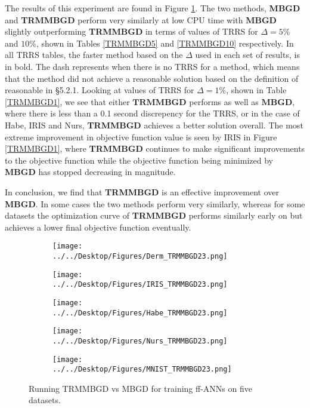 \documentclass[letterpaper,12pt,titlepage,oneside,final]{book}
\begin{document}
	The results of this experiment are found in Figure \ref{figure:TRMMBGD}. The two methods, \textbf{MBGD} and \textbf{TRMMBGD} perform very similarly at low CPU time with \textbf{MBGD} slightly outperforming \textbf{TRMMBGD} in terms of values of TRRS for $\Delta=5\%$ and $10\%$, shown in Tables \ref{TRMMBGD5} and \ref{TRMMBGD10} respectively.  In all TRRS tables, the faster method based on the $\Delta$ used in each set of results, is in bold. The dash represents when there is no TRRS for a method, which means that the method did not achieve a reasonable solution based on the definition of reasonable in \S{5.2.1}. Looking at values of TRRS for $\Delta=1\%$, shown in Table \ref{TRMMBGD1}, we see that either $\textbf{TRMMBGD}$ performs as well as $\mathbf{MBGD}$, where there is less than a 0.1 second discrepency for the TRRS, or in the case of Habe, IRIS and Nurs, \textbf{TRMMBGD} achieves a better solution overall. The most extreme improvement in objective function value is seen by IRIS in Figure \ref{TRMMBGD1}, where \textbf{TRMMBGD} continues to make significant improvements to the objective function while the objective function being minimized by \textbf{MBGD} has stopped decreasing in magnitude. 
	
	In conclusion, we find that \textbf{TRMMBGD} is an effective improvement over \textbf{MBGD}. In some cases the two methods perform very similarly, whereas for some datasets the optimization curve of \textbf{TRMMBGD} performs similarly early on but achieves a lower final objective function eventually. 
	
	
	\begin{figure}
		\centering
		\begin{subfigure}{.45\textwidth}
			\texttt{[image: ../../Desktop/Figures/Derm\_TRMMBGD23.png]}
		\end{subfigure}
		\begin{subfigure}{.45\textwidth}
			\texttt{[image: ../../Desktop/Figures/IRIS\_TRMMBGD23.png]}
		\end{subfigure}
		\begin{subfigure}{.45\textwidth}
			\texttt{[image: ../../Desktop/Figures/Habe\_TRMMBGD23.png]}
		\end{subfigure}
		\begin{subfigure}{.45\textwidth}
			\texttt{[image: ../../Desktop/Figures/Nurs\_TRMMBGD23.png]}
		\end{subfigure}
		\begin{subfigure}{.45\textwidth}
			\texttt{[image: ../../Desktop/Figures/MNIST\_TRMMBGD23.png]}
		\end{subfigure}
		\caption{Running TRMMBGD vs MBGD for training ff-ANNs on five datasets.}
		\label{figure:TRMMBGD}
	\end{figure}
	
\end{document}
